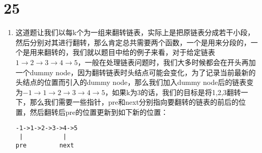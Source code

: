\documentclass[12pt,a4paper]{article}
\begin{document}
\section{25}
\begin{enumerate}
\item
\begin{CJK}{UTF8}{gbsn}
这道题让我们以每k个为一组来翻转链表，实际上是把原链表分成若干小段，然后分别对其进行翻转，那么肯定总共需要两个函数，一个是用来分段的，一个是用来翻转的，我们就以题目中给的例子来看，对于给定链表$1\rightarrow2\rightarrow3\rightarrow4\rightarrow5$，一般在处理链表问题时，我们大多时候都会在开头再加一个dummy node，因为翻转链表时头结点可能会变化，为了记录当前最新的头结点的位置而引入的dummy node，那么我们加入dummy node后的链表变为$-1\rightarrow1\rightarrow2\rightarrow3\rightarrow4\rightarrow5$，如果k为3的话，我们的目标是将1,2,3翻转一下，那么我们需要一些指针，pre和next分别指向要翻转的链表的前后的位置，然后翻转后pre的位置更新到如下新的位置：
\end{CJK}
\begin{lstlisting}
-1->1->2->3->4->5
 |           |
pre         next


\end{lstlisting}
\end{enumerate}
\end{document}
